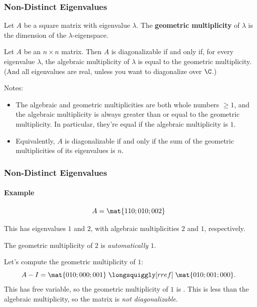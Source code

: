 \begin{frame}
\frametitle{Non-Distinct Eigenvalues}

\vskip-3mm
\begin{defn}
  Let $A$ be a square matrix with eigenvalue $\lambda$.  The
  \textbf{geometric multiplicity} of $\lambda$ is the dimension of the
  $\lambda$-eigenspace.
\end{defn}

\pause
\begin{thm}
  Let $A$ be an $n\times n$ matrix.  Then $A$ is diagonalizable if and only if,
  for every eigenvalue $\lambda$, the algebraic multiplicity of $\lambda$ is
  equal to the geometric multiplicity.\\
  \pause\smallskip
  (And all eigenvalues are real, unless you want to diagonalize over $\C$.)
\end{thm}

\pause\medskip
\alert{Notes:}
\begin{itemize}
\item The algebraic and geometric multiplicities are both whole numbers $\geq 1$,
  and the algebraic multiplicity is always greater than or equal to the
  geometric multiplicity.
  \pause
  In particular, they're equal if the algebraic multiplicity is $1$.
\pause
\item Equivalently, $A$ is diagonalizable if and only if the sum of the
  geometric multiplicities of its eigenvalues is $n$.

\end{itemize}

\end{frame}



\begin{frame}
\frametitle{Non-Distinct Eigenvalues}
\framesubtitle{Example}

\vskip-3mm
\[ A = \mat{1 1 0; 0 1 0; 0 0 2} \]

This has eigenvalues
\pause
$1$ and $2$,
with algebraic multiplicities
\pause
$2$ and $1$, respectively.

\pause\medskip
The geometric multiplicity of $2$ is
\pause
\emph{automatically $1$}.

\pause\medskip
Let's compute the geometric multiplicity of $1$:
\[ A - I = \mat{0 1 0; 0 0 0; 0 0 1}
\;\longsquiggly[rref]\; \mat{0 1 0; 0 0 1; 0 0 0}. \]
\pause
This has  free variable, so the geometric multiplicity of $1$
is .
\pause[9]
This is less than the algebraic multiplicity, so the matrix is
\emph{not diagonalizable}.

\end{frame}



